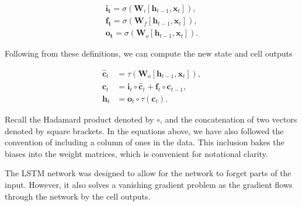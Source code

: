 \begin{align}
\boldsymbol{i_t} = \sigma(\boldsymbol{W}_i[\boldsymbol{h}_{t-1}, \boldsymbol{x}_t]),\\
\boldsymbol{f_t} = \sigma(\boldsymbol{W}_f[\boldsymbol{h}_{t-1}, \boldsymbol{x}_t]),\\
\boldsymbol{o_t} = \sigma(\boldsymbol{W}_o[\boldsymbol{h}_{t-1}, \boldsymbol{x}_t]).
\end{align}

\noindent Following from these definitions, we can compute the new state and cell outputs

\begin{align}
\hat{\boldsymbol{c}}_t &= \tau (\boldsymbol{W}_o[\boldsymbol{h}_{t-1}, \boldsymbol{x}_t]), \\
\boldsymbol{c}_t &= \boldsymbol{i}_t \circ \hat{\boldsymbol{c}}_t + \boldsymbol{f}_t \circ \boldsymbol{c}_{t-1}, \\ 
\boldsymbol{h}_t &= \boldsymbol{o}_t \circ \tau (\boldsymbol{c}_t).
\end{align}

\noindent Recall the Hadamard product denoted by $\circ$, and the concatenation of two vectors denoted by square brackets. In the equations above, we have also followed the convention of including a column of ones in the data. This inclusion bakes the biases into the weight matrices, which is convenient for notational clarity. 

The LSTM network was designed to allow for the network to forget parts of the input. However, it also solves a vanishing gradient problem as the gradient flows through the network by the cell outputs.
